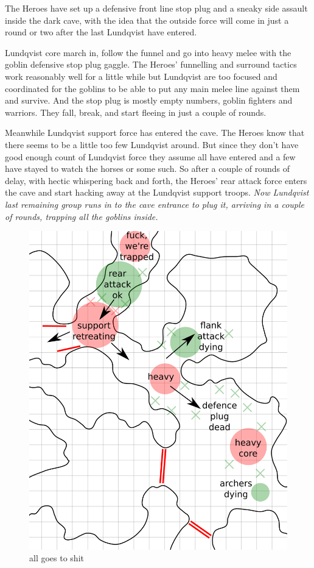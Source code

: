 The Heroes have set up a defensive front line stop plug and a sneaky side assault inside the dark cave, with the idea that the outside force will come in just a round or two after the last Lundqvist have entered.

Lundqvist core march in, follow the funnel and go into heavy melee with the goblin defensive stop plug gaggle. The Heroes' funnelling and surround tactics work reasonably well for a little while but Lundqvist are too focused and coordinated for the goblins to be able to put any main melee line against them and survive. And the stop plug is mostly empty numbers, goblin fighters and warriors. They fall, break, and start fleeing in just a couple of rounds.

Meanwhile Lundqvist support force has entered the cave. The Heroes know that there seems to be a little too few Lundqvist around. But since they don't have good enough count of Lundqvist force they assume all have entered and a few have stayed to watch the horses or some such.
So after a couple of rounds of delay, with hectic whispering back and forth, the Heroes' rear attack force enters the cave and start hacking away at the Lundqvist support troops. \textit{Now Lundqvist last remaining group runs in to the cave entrance to plug it, arriving in a couple of rounds, trapping all the goblins inside.}


\begin{figure}    %
\centering
\includegraphics[width=0.9\linewidth]{./fig/hool2lundqvistresult2-zoom.png}
\caption*{all goes to shit}
\end{figure}


